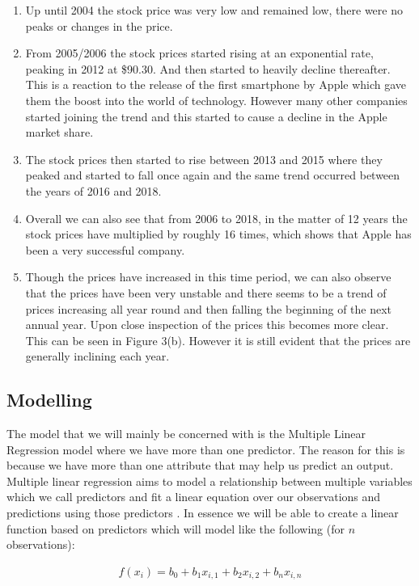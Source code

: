 \documentclass[11pt]{report}
\begin{document}
\begin{enumerate}
	\item Up until 2004 the stock price was very low and remained low, there were no peaks or changes in the price.
	\item From 2005/2006 the stock prices started rising at an exponential rate, peaking in 2012 at \$90.30. And then started to heavily decline thereafter. This is a reaction to the release of the first smartphone by Apple which gave them the boost into the world of technology. However many other companies started joining the trend and this started to cause a decline in the Apple market share. 
	\item The stock prices then started to rise between 2013 and 2015 where they peaked and started to fall once again and the same trend occurred between the years of 2016 and 2018. 
	\item Overall we can also see that from 2006 to 2018, in the matter of 12 years the stock prices have multiplied by roughly 16 times, which shows that Apple has been a very successful company. 
	\item Though the prices have increased in this time period, we can also observe that the prices have been very unstable and there seems to be a trend of prices increasing all year round and then falling the beginning of the next annual year. Upon close inspection of the prices this becomes more clear. This can be seen in Figure 3(b). However it is still evident that the prices are generally inclining each year. 
\end{enumerate}

\subsection{Modelling}

The model that we will mainly be concerned with is the Multiple Linear Regression model where we have more than one predictor. The reason for this is because we have more than one attribute that may help us predict an output. Multiple linear regression aims to model a relationship between multiple variables which we call predictors and fit a linear equation over our observations and predictions using those predictors \cite{statyale}. In essence we will be able to create a linear function based on predictors which will model like the following (for $n$ observations):

\begin{ceqn}
\begin{align*}
	f(x_{i}) = b_{0} + b_{1}x_{i,1} + b_{2}x_{i,2} + b_{n}x_{i,n}
\end{align*}
\end{ceqn}
\end{document}
